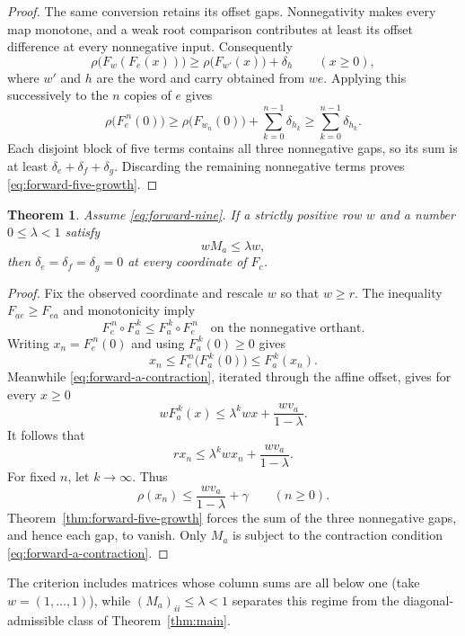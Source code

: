 \documentclass[11pt,a4paper]{article}
\newtheorem{theorem}{Theorem}
\begin{document}
\begin{proof}
The same conversion retains its offset gaps. Nonnegativity makes every
map monotone, and a weak root comparison contributes at least its
offset difference at every nonnegative input. Consequently
\[
 \rho\bigl(F_w(F_e(x))\bigr)
 \ge \rho\bigl(F_{w'}(x)\bigr)+\delta_h
 \qquad(x\ge0),
\]
where $w'$ and $h$ are the word and carry obtained from $we$.
Applying this successively to the $n$ copies of $e$ gives
\[
 \rho\bigl(F_e^{\,n}(0)\bigr)
 \ge \rho\bigl(F_{w_n}(0)\bigr)
       +\sum_{k=0}^{n-1}\delta_{h_k}
 \ge \sum_{k=0}^{n-1}\delta_{h_k}.
\]
Each disjoint block of five terms contains all three nonnegative gaps,
so its sum is at least $\delta_e+\delta_f+\delta_g$. Discarding the
remaining nonnegative terms proves \eqref{eq:forward-five-growth}.
\end{proof}

\begin{theorem}\label{thm:forward-contraction}
Assume \eqref{eq:forward-nine}. If a strictly positive row $w$ and a
number $0\le\lambda<1$ satisfy
\begin{equation}\label{eq:forward-a-contraction}
 wM_a\le\lambda w,
\end{equation}
then $\delta_e=\delta_f=\delta_g=0$ at every coordinate of $F_c$.
\end{theorem}

\begin{proof}
Fix the observed coordinate and rescale $w$ so that $w\ge r$.
The inequality $F_{ae}\ge F_{ea}$ and monotonicity imply
\[
 F_e^{\,n}\circ F_a^{\,k}\le F_a^{\,k}\circ F_e^{\,n}
 \quad\text{on the nonnegative orthant}.
\]
Writing $x_n=F_e^{\,n}(0)$ and using $F_a^{\,k}(0)\ge0$ gives
\[
 x_n\le F_e^{\,n}\bigl(F_a^{\,k}(0)\bigr)
     \le F_a^{\,k}(x_n).
\]
Meanwhile \eqref{eq:forward-a-contraction}, iterated through the affine
offset, gives for every $x\ge0$
\[
 wF_a^{\,k}(x)
 \le\lambda^k wx+\frac{wv_a}{1-\lambda}.
\]
It follows that
\[
 rx_n\le\lambda^k wx_n+\frac{wv_a}{1-\lambda}.
\]
For fixed $n$, let $k\to\infty$. Thus
\[
 \rho(x_n)\le\frac{wv_a}{1-\lambda}+\gamma
 \qquad(n\ge0).
\]
Theorem~\ref{thm:forward-five-growth} forces the sum of the three
nonnegative gaps, and hence each gap, to vanish. Only $M_a$ is subject
to the contraction condition \eqref{eq:forward-a-contraction}.
\end{proof}

The criterion includes matrices whose column sums are all below one
(take $w=(1,\ldots,1)$), while $(M_a)_{ii}\le\lambda<1$ separates this
regime from the diagonal-admissible class of Theorem~\ref{thm:main}.
\end{document}
